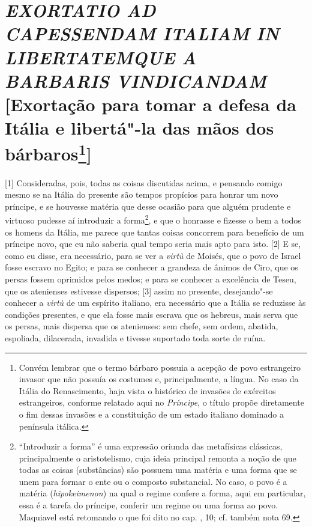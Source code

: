 \quebra\section{\emph{EXORTATIO AD CAPESSENDAM ITALIAM IN LIBERTATEMQUE A BARBARIS VINDICANDAM}
{[}Exortação para tomar a defesa da Itália e libertá"-la das mãos dos
bárbaros\protect\footnote{\uppercase{C}onvém lembrar que o termo bárbaro possuia a acepção
  de povo estrangeiro invasor que não possuía os costumes e,
  principalmente, a língua. No caso da Itália do Renascimento, haja
  vista o histórico de invasões de exércitos estrangeiros, conforme
  relatado aqui no \emph{Príncipe}, o título propõe diretamente o fim
  dessas invasões e a constituição de um estado italiano dominado a
  península itálica.}{]}}

{[}1{]} Consideradas, pois, todas as coisas discutidas acima, e pensando
comigo mesmo se na Itália do presente são tempos propícios para honrar
um novo príncipe, e se houvesse matéria que desse ocasião para que
alguém prudente e virtuoso pudesse aí introduzir a forma\footnote{``Introduzir
  a forma'' é uma expressão oriunda das metafísicas clássicas,
  principalmente o aristotelismo, cuja ideia principal remonta a noção
  de que todas as coisas (substâncias) são possuem uma matéria e uma
  forma que se unem para formar o ente ou o composto substancial. No
  caso, o povo é a matéria (\emph{hipokeimenon}) na qual o regime
  confere a forma, aqui em particular, essa é a tarefa do príncipe,
  conferir um regime ou uma forma ao povo. Maquiavel está retomando o
  que foi dito no cap. , 10; cf. também nota 69.}, e que o honrasse e
fizesse o bem a todos os homens da Itália, me parece que tantas coisas
concorrem para benefício de um príncipe novo, que eu não saberia qual
tempo seria mais apto para isto. {[}2{]} E se, como eu disse, era
necessário, para se ver a \emph{virtù} de Moisés, que o povo de Israel
fosse escravo no Egito; e para se conhecer a grandeza de ânimos de Ciro,
que os persas fossem oprimidos pelos medos; e para se conhecer a
excelência de Teseu, que os atenienses estivesse dispersos; {[}3{]}
assim no presente, desejando"-se conhecer a \emph{virtù} de um espírito
italiano, era necessário que a Itália se reduzisse às condições
presentes, e que ela fosse mais escrava que os hebreus, mais serva que
os persas, mais dispersa que os atenienses: sem chefe, sem ordem,
abatida, espoliada, dilacerada, invadida e tivesse suportado toda sorte
de ruína.

